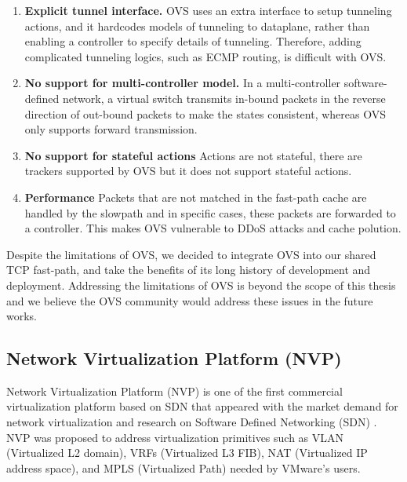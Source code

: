 \begin{enumerate}
    \item \textbf{Explicit tunnel interface.} OVS uses an extra interface to setup tunneling
    actions, and it hardcodes models of tunneling to dataplane, rather than enabling
    a controller to specify details of tunneling. Therefore, adding complicated tunneling 
    logics, such as ECMP routing, is difficult with OVS. 

    \item \textbf{No support for multi-controller model.} In a multi-controller 
    software-defined network, a virtual switch transmits in-bound packets in the reverse 
    direction of out-bound packets to make the states consistent, whereas OVS only supports forward transmission. 

    \item \textbf{No support for stateful actions} Actions are not stateful, there are 
    trackers supported by OVS but it does not support stateful actions. %

    \item \textbf{Performance} Packets that are not matched in the fast-path cache are 
    handled by the slowpath and in specific cases, these packets are forwarded to a 
    controller. This makes OVS vulnerable to DDoS attacks and cache polution.  %

\end{enumerate}

Despite the limitations of OVS, we decided to integrate OVS into our shared TCP fast-path,
and take the benefits of its long history of development and deployment. Addressing 
the limitations of OVS is beyond the scope of this thesis and we believe the OVS community would
address these issues in the future works. 

\subsection{Network Virtualization Platform (NVP)}
\label{nvp}
Network Virtualization Platform (NVP) is one of the first commercial virtualization 
platform based on SDN that appeared with the market demand for network virtualization
and research on Software Defined Networking (SDN) \cite{koponen2014network}. NVP was proposed 
to address virtualization primitives such as VLAN (Virtualized L2 domain), 
VRFs (Virtualized L3 FIB), NAT 
(Virtualized IP address space), and MPLS (Virtualized Path) needed by VMware's users.

